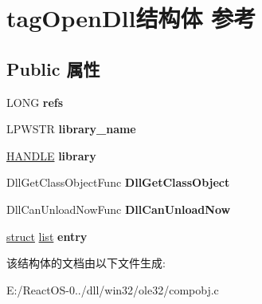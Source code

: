 \hypertarget{structtag_open_dll}{}\section{tag\+Open\+Dll结构体 参考}
\label{structtag_open_dll}
\subsection*{Public 属性}
\begin{DoxyCompactItemize}
\item 
\mbox{\label{structtag_open_dll_a07b2594942fb57107737ca66aae57157}} 
L\+O\+NG {\bfseries refs}
\item 
\mbox{\label{structtag_open_dll_ac673298f34b775925a05522580bc9b9b}} 
L\+P\+W\+S\+TR {\bfseries library\+\_\+name}
\item 
\mbox{\label{structtag_open_dll_a7833c68f87813c2d8c208bb8c42ccbd2}} 
\hyperlink{interfacevoid}{H\+A\+N\+D\+LE} {\bfseries library}
\item 
\mbox{\label{structtag_open_dll_aa29ecb530291add3c555f5ca8e68b433}} 
Dll\+Get\+Class\+Object\+Func {\bfseries Dll\+Get\+Class\+Object}
\item 
\mbox{\label{structtag_open_dll_a2c04f21fdd50ed01b60496a46e43a23c}} 
Dll\+Can\+Unload\+Now\+Func {\bfseries Dll\+Can\+Unload\+Now}
\item 
\mbox{\label{structtag_open_dll_af0388c75b9163c1fd53c4a0738bf7e18}} 
\hyperlink{interfacestruct}{struct} \hyperlink{classlist}{list} {\bfseries entry}
\end{DoxyCompactItemize}


该结构体的文档由以下文件生成\+:\begin{DoxyCompactItemize}
\item 
E\+:/\+React\+O\+S-\/0../dll/win32/ole32/compobj.\+c\end{DoxyCompactItemize}
